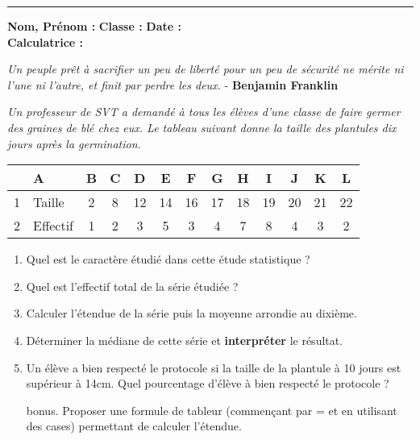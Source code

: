 \documentclass[12pt]{article}
\newcommand{\horrule}[1]{\rule{\linewidth}{#1}} %
\begin{document}
\vspace{0.5cm}
\horrule{1px}
\vspace{0.5cm}

\textbf{Nom, Prénom :} \hspace{8cm} \textbf{Classe :} \hspace{3cm} \textbf{Date :}\\
\textbf{Calculatrice :}

\begin{center}
  \textit{Un peuple prêt à sacrifier un peu de liberté pour un peu de sécurité ne mérite ni l'une ni l'autre, et finit par perdre les deux.} - \textbf{Benjamin Franklin}
\end{center}



\setlength{\columnseprule}{1pt}


\textit{Un professeur de SVT a demandé à tous les élèves d'une classe de faire germer des graines de blé chez eux. Le tableau suivant donne la taille des plantules dix jours après la germination.}

\begin{center}
  \begin{tabular}{| l || l | c | c | c  | c  | c  | c  | c  | c  | c  | c  | c |}
    \hline
    &        A & B & C &  D &  E &  F &  G &  H &  I &  J &  K & L \\ 
    \hline
    1 &   Taille & 2 & 8 & 12 & 14 & 16 & 17 & 18 & 19 & 20 & 21 & 22 \\
    \hline 
    2 & Effectif & 1 & 2 &  3 &  5 &  3 &  4 &  7 &  8 &  4 &  3 &  2 \\
    \hline
  \end{tabular}
\end{center}

\begin{enumerate}
\item Quel est le caractère étudié dans cette étude statistique ?
\item Quel est l'effectif total de la série étudiée ?
\item Calculer l'étendue de la série puis la moyenne arrondie au dixième.
\item Déterminer la médiane de cette série et \textbf{interpréter} le résultat.
\item Un élève a bien respecté le protocole si la taille de la plantule à 10 jours est supérieur à 14cm. Quel pourcentage d'élève à bien respecté le protocole ?

\item[bonus.] Proposer une formule de tableur (commençant par = et en utilisant des cases) permettant de calculer l'étendue.
\end{enumerate}
\end{document}
